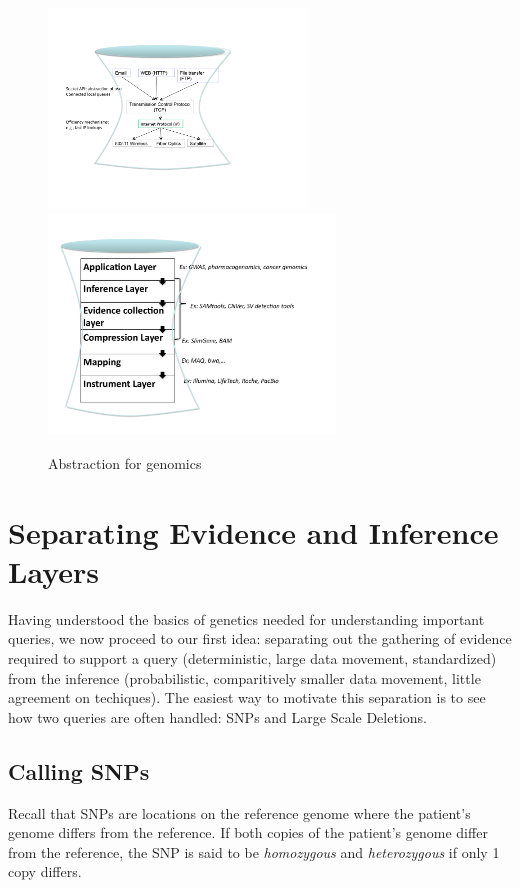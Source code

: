 \documentclass[10pt,fullpage]{article}
\begin{document}
\begin{figure}[h!]
  \centering
  \includegraphics[trim = 0mm 40mm 60mm 10mm, clip, width=2.7in]{fig/hourglass.pdf}
  \includegraphics[trim = 0mm 10mm 0mm 20mm, clip, width=3.0in]{fig/genomicabstraction.pdf}
  \caption{Abstraction for genomics}
  \label{fig:abstraction}
\end{figure}

\section{Separating Evidence and Inference Layers}

Having understood the basics of genetics needed for understanding
important queries, we now proceed to our first idea: separating 
out the gathering of evidence required to support a query 
(deterministic, large data movement, standardized) from the inference
(probabilistic, comparitively smaller data movement, little
agreement on techiques).  The easiest way to motivate this separation
is to see how two queries are often handled: SNPs and Large Scale
Deletions.

\subsection{Calling SNPs}

Recall that SNPs are locations on the reference genome where the
patient's genome differs from the reference.   If both copies of
the patient's genome differ from the reference, the SNP is said
to be {\em homozygous} and {\em heterozygous} if only 1 copy 
differs.
\end{document}
